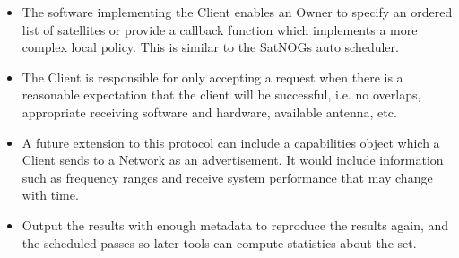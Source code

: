 \documentclass{article}
\begin{document}
\begin{itemize}
    \item The software implementing the Client enables an Owner to specify an ordered list of satellites or provide a callback function which implements a more complex local policy. This is similar to the SatNOGs auto scheduler.
	\item The Client is responsible for only accepting a request when there is a reasonable expectation that the client will be successful, i.e. no overlaps, appropriate receiving software and hardware, available antenna, etc.
	\item A future extension to this protocol can include a capabilities object which a Client sends to a Network as an advertisement. It would include information such as frequency ranges and receive system performance that may change with time.
	\item Output the results with enough metadata to reproduce the results again, and the scheduled passes so later tools can compute statistics about the set.
\end{itemize}
\end{document}
